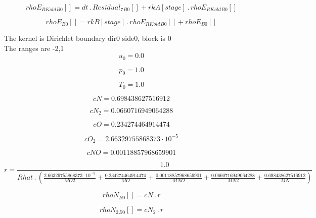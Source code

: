 \documentclass{article}
\begin{document}
\begin{dmath}{rhoE_{RKold}{_{B0}}}[{}] = dt \,.\, {Residual_{7}{_{B0}}}[{}] + {rkA}[{stage}] \,.\, {rhoE_{RKold}{_{B0}}}[{}]\end{dmath}

\begin{dmath}{rhoE{_{B0}}}[{}] = {rkB}[{stage}] \,.\, {rhoE_{RKold}{_{B0}}}[{}] + {rhoE{_{B0}}}[{}]\end{dmath}

\noindent The kernel is Dirichlet boundary dir0 side0, block is 0\\\noindent The ranges are -2,1\\\begin{dmath}u_{0} = 0.0\end{dmath}

\begin{dmath}p_{0} = 1.0\end{dmath}

\begin{dmath}T_{0} = 1.0\end{dmath}

\begin{dmath}cN = 0.698438627516912\end{dmath}

\begin{dmath}cN_{2} = 0.0660716949064288\end{dmath}

\begin{dmath}cO = 0.234274464914474\end{dmath}

\begin{dmath}cO_{2} = 2.66329755868373 \cdot 10^{-5}\end{dmath}

\begin{dmath}cNO = 0.00118857968659901\end{dmath}

\begin{dmath}r = \frac{1.0}{Rhat \,.\, \left(\frac{2.66329755868373 \cdot 10^{-5}}{MO2} + \frac{0.234274464914474}{MO} + \frac{0.00118857968659901}{MNO} + \frac{0.0660716949064288}{MN2} + \frac{0.698438627516912}{MN}\right)}\end{dmath}

\begin{dmath}{rhoN{_{B0}}}[{}] = cN \,.\, r\end{dmath}

\begin{dmath}{rhoN_{2}{_{B0}}}[{}] = cN_{2} \,.\, r\end{dmath}
\end{document}
